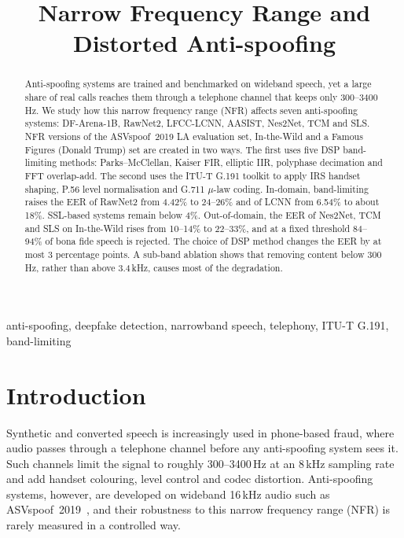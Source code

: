 \documentclass[conference]{IEEEtran}
\newcommand{\todo}[1]{\textcolor{red}{[TODO: #1]}}
\begin{document}
\title{Narrow Frequency Range and Distorted Anti-spoofing}

\author{\IEEEauthorblockN{\todo{Authors}}
\IEEEauthorblockA{\todo{Affiliation}\\ \todo{Email}}}

\maketitle

\begin{abstract}
Anti-spoofing systems are trained and benchmarked on wideband
speech, yet a large share of real calls reaches them through a
telephone channel that keeps only 300--3400\,Hz. We study how this narrow
frequency range (NFR) affects seven anti-spoofing systems: DF-Arena-1B, RawNet2, LFCC-LCNN,
AASIST, Nes2Net, TCM and SLS. NFR versions of the ASVspoof~2019 LA
evaluation set, In-the-Wild and a Famous Figures (Donald Trump) set are
created in two ways. The first uses five DSP band-limiting methods:
Parks--McClellan, Kaiser FIR, elliptic IIR, polyphase decimation and FFT
overlap-add. The second uses the ITU-T G.191 toolkit to apply IRS handset
shaping, P.56 level normalisation and G.711 $\mu$-law coding. In-domain,
band-limiting raises the EER of RawNet2 from 4.42\% to 24--26\% and of LCNN
from 6.54\% to about 18\%. SSL-based systems remain below 4\%. Out-of-domain,
the EER of Nes2Net, TCM and SLS on In-the-Wild rises from 10--14\% to
22--33\%, and at a fixed threshold 84--94\% of bona fide speech is
rejected. The choice of DSP method changes the EER by at most 3 percentage
points. A sub-band ablation shows that removing content below 300\,Hz,
rather than above 3.4\,kHz, causes most of the degradation.
\end{abstract}

\begin{IEEEkeywords}
anti-spoofing, deepfake detection, narrowband speech, telephony, ITU-T G.191, band-limiting
\end{IEEEkeywords}

\section{Introduction}

Synthetic and converted speech is increasingly used in phone-based fraud,
where audio passes through a telephone channel before any anti-spoofing system sees
it. Such channels limit the signal to roughly 300--3400\,Hz at an 8\,kHz
sampling rate and add handset colouring, level control and codec
distortion. Anti-spoofing systems, however, are developed on
wideband 16\,kHz audio such as ASVspoof~2019~\cite{wang2020asvspoof}, and
their robustness to this narrow frequency range (NFR) is rarely measured
in a controlled way.
\end{document}
